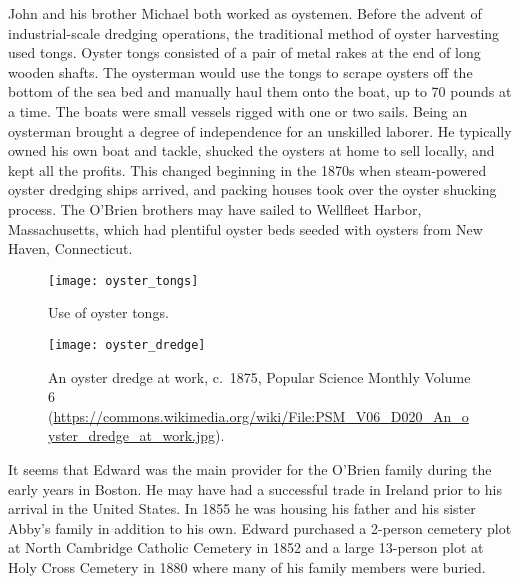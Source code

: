 John and his brother Michael both worked as oystemen.\cite{EdwardFrancis3OBrienBirth,Michael2OBrien1886,1861John2OBrien} Before the advent of industrial-scale dredging operations, the traditional method of oyster harvesting used tongs. Oyster tongs consisted of a pair of metal rakes at the end of long wooden shafts. The oysterman would use the tongs to scrape oysters off the bottom of the sea bed and manually haul them onto the boat, up to 70 pounds at a time. The boats were small vessels rigged with one or two sails.\cite{Botwick:95} Being an oysterman brought a degree of independence for an unskilled laborer. He typically owned his own boat and tackle, shucked the oysters at home to sell locally, and kept all the profits.\cite{MacKenzie:7, Botwick:96} This changed beginning in the 1870s when steam-powered oyster dredging ships arrived, and packing houses took over the oyster shucking process.\cite{MacKenzie:5, MacKenzie:7} The O'Brien brothers may have sailed to Wellfleet Harbor, Massachusetts, which had plentiful oyster beds seeded with oysters from New Haven, Connecticut.\cite{MacKenzie:29}

\begin{figure}
	\centering
	\texttt{[image: oyster\_tongs]}
	\caption{Use of oyster tongs.\cite{MacKenzie:4}}
\end{figure}

\begin{figure}
	\centering
	\texttt{[image: oyster\_dredge]}
	\caption{An oyster dredge at work, c.\ 1875, Popular Science Monthly Volume 6 (\url{https://commons.wikimedia.org/wiki/File:PSM_V06_D020_An_oyster_dredge_at_work.jpg}).}
\end{figure}

It seems that Edward was the main provider for the O'Brien family during the early years in Boston. He may have had a successful trade in Ireland prior to his arrival in the United States. In 1855 he was housing his father and his sister Abby's family in addition to his own.\cite{Census1855William} Edward purchased a 2-person cemetery plot at North Cambridge Catholic Cemetery in 1852\cite{CarolGordon} and a large 13-person plot at Holy Cross Cemetery in 1880\cite{HolyCrossPlot} where many of his family members were buried.


